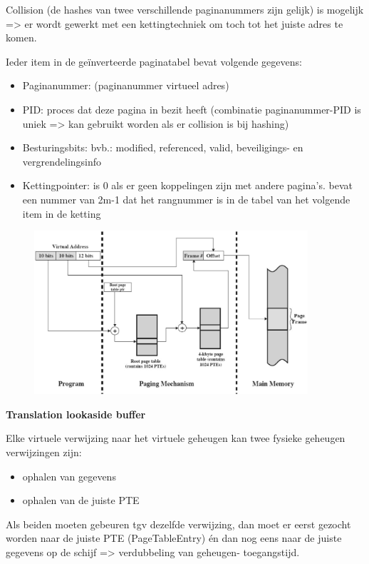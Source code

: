 Collision (de hashes van twee verschillende paginanummers zijn gelijk) is mogelijk => er wordt gewerkt met een kettingtechniek om toch tot het juiste adres te komen.

Ieder item in de geïnverteerde paginatabel bevat volgende gegevens:


\begin{itemize}
\item Paginanummer: (paginanummer virtueel adres)
\item PID: proces dat deze pagina in bezit heeft (combinatie paginanummer-PID is uniek => kan gebruikt worden als er collision is bij hashing)
\item Besturingsbits: bvb.: modified, referenced, valid, beveiligings- en vergrendelingsinfo
\item Kettingpointer: is 0 als er geen koppelingen zijn met andere pagina's. bevat een nummer van 2m-1 dat het rangnummer is in de tabel van het volgende item in de ketting
\end{itemize}

\begin{figure}[htp]
    \centering
            \includegraphics[width=4in]{img/Geinventeerdepaginatabel.jpg}
        \caption{}
    \label{fig:}
\end{figure}

\textbf{Translation lookaside buffer}

Elke virtuele verwijzing naar het virtuele geheugen kan twee fysieke geheugen verwijzingen zijn:

\begin{itemize}
\item ophalen van gegevens
\item ophalen van de juiste PTE
\end{itemize}

Als beiden moeten gebeuren tgv dezelfde verwijzing, dan moet er eerst gezocht worden naar de juiste PTE (PageTableEntry) én dan nog eens naar de juiste gegevens op de schijf => verdubbeling van geheugen- toegangstijd.

